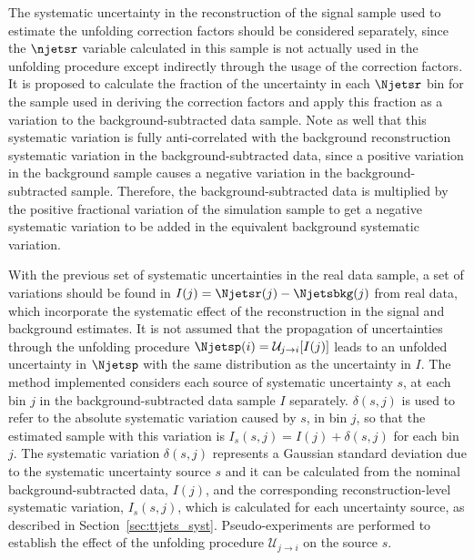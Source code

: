 The systematic uncertainty in the reconstruction of the \ttbar signal sample
used to estimate the unfolding correction factors should be considered separately, since the $\njetsr$ variable calculated in this sample
is not actually used in the unfolding procedure
except indirectly through the usage of the correction factors.
It is proposed
to calculate the fraction of the uncertainty in each $\Njetsr$ bin for the \ttbar sample used in deriving the correction factors and apply this fraction as a variation
to the background-subtracted data sample.
Note as well that this systematic variation is fully anti-correlated with the background reconstruction systematic variation
in the background-subtracted data,
since a positive variation in the background sample causes a negative variation in the background-subtracted sample. Therefore,  the background-subtracted data is multiplied by the positive fractional variation of the simulation \ttbar sample to get a negative systematic variation to be added in the
equivalent background systematic variation.

With the previous set of systematic uncertainties in the real data sample, a set of variations should be found in $I(j) = \Njetsr(j) - \Njetsbkg (j)$ from real data,
which incorporate the systematic effect of the reconstruction in the signal and background estimates.
It is not assumed that the propagation of uncertainties through the unfolding procedure $\Njetsp(i) = \mathcal{U}_{j \rightarrow i}[I(j)]$
leads to an unfolded uncertainty in $\Njetsp$ with the same distribution as the uncertainty in $I$.
The method implemented considers each source of systematic uncertainty $s$, at
each bin $j$ in the background-subtracted data sample $I$ separately. $\delta(s, j)$ is used to refer to the absolute systematic variation caused by $s$, in bin $j$, so that
the estimated sample with this variation is $I_s(s,j) = I(j) + \delta(s,j)$ for each bin $j$.
The systematic variation $\delta(s,j)$ represents a Gaussian standard deviation due to the systematic uncertainty source $s$ and it can
be calculated from the nominal background-subtracted data, $I(j)$, and the corresponding reconstruction-level systematic variation, $I_s(s,j)$, which is calculated
for each uncertainty source, as described in Section~\ref{sec:ttjets_syst}.
Pseudo-experiments are performed
to establish the effect of the unfolding procedure $\mathcal{U}_{j \rightarrow i}$ on the source $s$.

